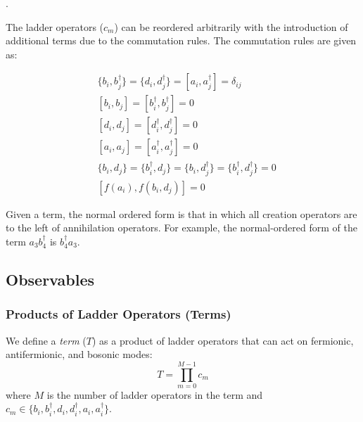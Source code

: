.

The ladder operators ($c_m$) can be reordered arbitrarily with the introduction of additional terms due to the commutation rules.
The commutation rules are given as:

\begin{equation}
    \label{eq:commutation}
    \begin{split}
        &\{b_i, b_j^\dagger\} = \{d_i, d_j^\dagger\} = [a_i, a_j^\dagger] = \delta_{ij}\\
        & [b_i, b_j] = [b_i^\dagger, b_j^\dagger] = 0 \\
        & [d_i, d_j] = [d_i^\dagger, d_j^\dagger] = 0 \\
        & [a_i, a_j] = [a_i^\dagger, a_j^\dagger] = 0 \\
        & \{b_i, d_j\} = \{b_i^\dagger, d_j\} = \{b_i, d_j^\dagger\} = \{b_i^\dagger, d_j^\dagger\} = 0\\
        & [f(a_i), f(b_i, d_j)] = 0
    \end{split}
\end{equation}

Given a term, the normal ordered form is that in which all creation operators are to the left of annihilation operators.
For example, the normal-ordered form of the term $a_3 b_4^\dagger$ is $b_4^\dagger a_3$.

\subsection{Observables}
\label{subsec:observables}

\subsubsection{Products of Ladder Operators (Terms)}

We define a \textit{term} ($T$) as a product of ladder operators that can act on fermionic, antifermionic, and bosonic modes:
\begin{equation}
    \label{eq:term}
    T = \prod_{m=0}^{M-1} c_m
\end{equation}
where $M$ is the number of ladder operators in the term and $c_m \in \{b_i, b_i^\dagger, d_i, d_i^\dagger, a_i, a_i^\dagger\}$.


